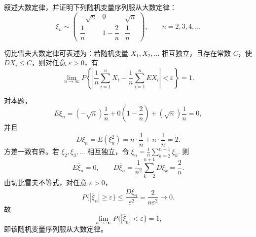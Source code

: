 \documentclass[lang=cn,11pt]{elegantbook}
\begin{document}
\begin{exercise}\label{exer:src-2007-a-14}
叙述大数定律，并证明下列随机变量序列服从大数定律：
\[
\xi_n\sim
\begin{pmatrix}
-\sqrt n & 0 & \sqrt n\\
\dfrac1n & 1-\dfrac2n & \dfrac1n
\end{pmatrix},
\qquad n=2,3,4,\dots
\]
\end{exercise}
\begin{solution}
切比雪夫大数定律可表述为：若随机变量 \(X_1,X_2,\dots\) 相互独立，且存在常数 \(C\)，使 \(DX_i\le C\)，则对任意 \(\varepsilon>0\)，有
\[
\lim_{n\to\infty}
P\!\left\{\left|\frac1n\sum_{i=1}^n X_i-\frac1n\sum_{i=1}^n EX_i\right|<\varepsilon\right\}=1.
\]

对本题，
\[
E\xi_n=(-\sqrt n)\frac1n+0\left(1-\frac2n\right)+(\sqrt n)\frac1n=0,
\]
并且
\[
D\xi_n=E(\xi_n^2)=n\cdot\frac1n+n\cdot\frac1n=2.
\]
方差一致有界。若 \(\xi_2,\xi_3,\dots\) 相互独立，令
\(
\overline{\xi}_n=\frac1n\sum_{k=2}^{n+1}\xi_k.
\)
则
\[
E\overline{\xi}_n=0,\qquad
D\overline{\xi}_n=\frac1{n^2}\sum_{k=2}^{n+1}D\xi_k=\frac{2}{n}.
\]
由切比雪夫不等式，对任意 \(\varepsilon>0\)，
\[
P\{|\overline{\xi}_n| \ge \varepsilon\}
\le \frac{D\overline{\xi}_n}{\varepsilon^2}
=\frac{2}{n\varepsilon^2}\to0.
\]
故
\[
\lim_{n\to\infty}P\{|\overline{\xi}_n|<\varepsilon\}=1,
\]
即该随机变量序列服从大数定律。
\end{solution}
\end{document}
